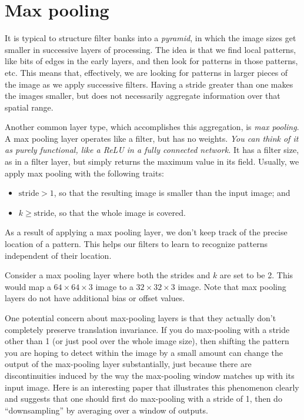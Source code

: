 \section{Max pooling}
It is typical  to structure
filter banks into a {\em pyramid}, in which the image sizes get
smaller in successive layers of processing.  The idea is  that we find
local patterns, like bits of edges in the early layers, and then look
for patterns  in those patterns, etc.   This means that, effectively,
we are looking for patterns in larger pieces of the image as we apply
successive filters.  Having a stride greater than one makes the images
smaller, but does not necessarily aggregate information over that
spatial range.

Another common layer type, which accomplishes this aggregation, is
  {\em max pooling}.
A max pooling layer operates like a filter, but has no weights. {\em
    You can think of it as purely functional, like a ReLU in a fully connected network.}  It has a filter size, as in a filter
layer, but simply returns the maximum value in its field.
Usually, we
apply max pooling with the following traits:
\begin{itemize}
  \item $\text{stride} > 1$,  so that the resulting image is smaller
        than the input image; and
  \item $k \geq \text{stride}$, so that the whole image is covered.
\end{itemize}
As a result of applying a max pooling layer, we don't keep track of
the precise location of a pattern. This helps our filters to learn to
recognize patterns independent of their location.

Consider a max pooling layer where both the strides and $k$ are set to be 2. This would
map a $64 \times 64 \times 3$ image to a $32 \times 32 \times 3$
image. Note that max pooling layers do not have additional bias or
offset values.

One potential concern about max-pooling layers is that they
actually don't completely preserve translation invariance. If you do
max-pooling with a stride other than 1 (or just pool over the whole
image size), then shifting the pattern you are hoping to detect within
the image by a small amount can change the output of the max-pooling
layer substantially, just because there are discontinuities induced by
the way the max-pooling window matches up with its input image.
Here is an interesting paper 
that illustrates this phenomenon clearly
and suggests that one should first do max-pooling with a stride of 1,
then do ``downsampling'' by averaging over a window of outputs.

